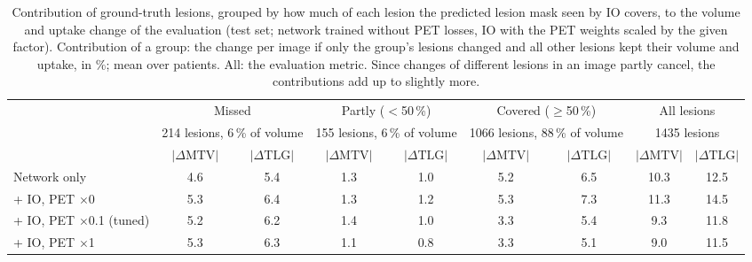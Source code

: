 \begin{table}[t]
\centering
\caption{Contribution of ground-truth lesions, grouped by how much of each lesion the predicted lesion mask seen by IO covers, to the volume and uptake change of the evaluation (test set; network trained without PET losses, IO with the PET weights scaled by the given factor).
 Contribution of a group: the change per image if only the group's lesions changed and all other lesions kept their volume and uptake, in \%; mean over patients.
 All: the evaluation metric.
 Since changes of different lesions in an image partly cancel, the contributions add up to slightly more.}
\label{tab:detection_contributions}
\scriptsize
\setlength{\tabcolsep}{3pt}
\begin{tabular}{lcccccccc}
\toprule
 & \multicolumn{2}{c}{Missed} & \multicolumn{2}{c}{Partly ($<$50\,\%)} & \multicolumn{2}{c}{Covered ($\geq$50\,\%)} & \multicolumn{2}{c}{All lesions} \\
 & \multicolumn{2}{c}{\tiny 214 lesions, 6\,\% of volume} & \multicolumn{2}{c}{\tiny 155 lesions, 6\,\% of volume} & \multicolumn{2}{c}{\tiny 1066 lesions, 88\,\% of volume} & \multicolumn{2}{c}{\tiny 1435 lesions} \\
\cmidrule(lr){2-3}\cmidrule(lr){4-5}\cmidrule(lr){6-7}\cmidrule(lr){8-9}
 & $|\Delta\mathrm{MTV}|$ & $|\Delta\mathrm{TLG}|$ & $|\Delta\mathrm{MTV}|$ & $|\Delta\mathrm{TLG}|$ & $|\Delta\mathrm{MTV}|$ & $|\Delta\mathrm{TLG}|$ & $|\Delta\mathrm{MTV}|$ & $|\Delta\mathrm{TLG}|$ \\
\midrule
Network only & 4.6 & 5.4 & 1.3 & 1.0 & 5.2 & 6.5 & 10.3 & 12.5 \\
\midrule
+ IO, PET $\times$0 & 5.3 & 6.4 & 1.3 & 1.2 & 5.3 & 7.3 & 11.3 & 14.5 \\
+ IO, PET $\times$0.1 (tuned) & 5.2 & 6.2 & 1.4 & 1.0 & 3.3 & 5.4 & 9.3 & 11.8 \\
+ IO, PET $\times$1 & 5.3 & 6.3 & 1.1 & 0.8 & 3.3 & 5.1 & 9.0 & 11.5 \\
\bottomrule
\end{tabular}
\end{table}
